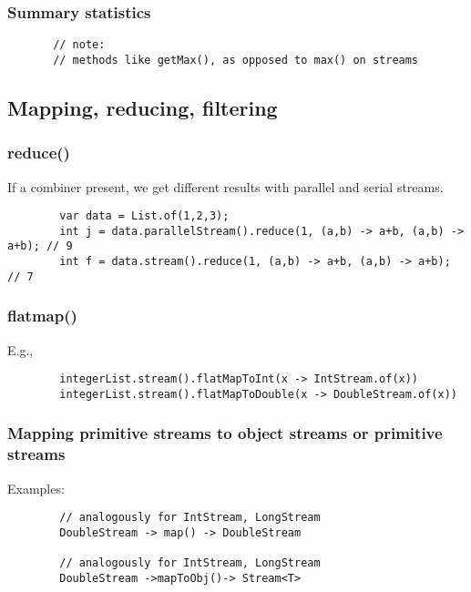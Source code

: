 \documentclass{scrartcl}
\begin{document}
\subsubsection{Summary statistics}

    \begin{lstlisting}
       // note:
       // methods like getMax(), as opposed to max() on streams
    \end{lstlisting}

\subsection{Mapping, reducing, filtering}
\subsubsection{reduce()}

    If a combiner present, we get different results with parallel and serial streams.

    \begin{lstlisting}
        var data = List.of(1,2,3);
        int j = data.parallelStream().reduce(1, (a,b) -> a+b, (a,b) -> a+b); // 9
        int f = data.stream().reduce(1, (a,b) -> a+b, (a,b) -> a+b); // 7
    \end{lstlisting}

\subsubsection{flatmap()}

    E.g.,

    \begin{lstlisting}
        integerList.stream().flatMapToInt(x -> IntStream.of(x))
        integerList.stream().flatMapToDouble(x -> DoubleStream.of(x))
    \end{lstlisting}

\subsubsection{Mapping primitive streams to object streams or primitive streams}

    Examples:

    \begin{lstlisting}
        // analogously for IntStream, LongStream
        DoubleStream -> map() -> DoubleStream

        // analogously for IntStream, LongStream
        DoubleStream ->mapToObj()-> Stream<T>

    \end{lstlisting}
\end{document}
